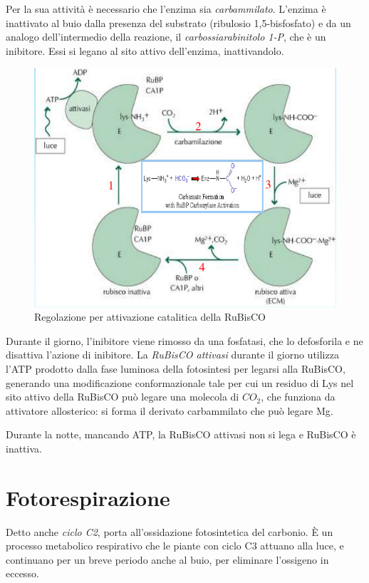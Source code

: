 \documentclass[a4paper,12pt]{book}
\begin{document}
Per la sua attività è necessario che l'enzima sia \emph{carbammilato}. L'enzima è inattivato al buio dalla presenza del substrato (ribulosio 1,5-bisfosfato) e da un analogo dell'intermedio della reazione, il \emph{carbossiarabinitolo 1-P}, che è un inibitore. Essi si legano al sito attivo dell'enzima, inattivandolo. 
\begin{figure}[H]
\centering
\includegraphics[scale=0.4]{immagini/reg4.jpg}
\caption{Regolazione per attivazione catalitica della RuBisCO}
\end{figure}
Durante il giorno, l'inibitore viene rimosso da una fosfatasi, che lo defosforila e ne disattiva l'azione di inibitore. La \emph{RuBisCO attivasi} durante il giorno utilizza l'ATP prodotto dalla fase luminosa della fotosintesi per legarsi alla RuBisCO, generando una modificazione conformazionale tale per cui un residuo di Lys nel sito attivo della RuBisCO può legare una molecola di $CO_{2}$, che funziona da attivatore allosterico: si forma il derivato carbammilato che può legare Mg.

Durante la notte, mancando ATP, la RuBisCO attivasi non si lega e RuBisCO è inattiva.

\section{Fotorespirazione}
Detto anche \emph{ciclo C2}, porta all'ossidazione fotosintetica del carbonio.
È un processo metabolico respirativo che le piante con ciclo C3 attuano alla luce, e continuano per un breve periodo anche al buio, per eliminare l'ossigeno in eccesso.
\end{document}
